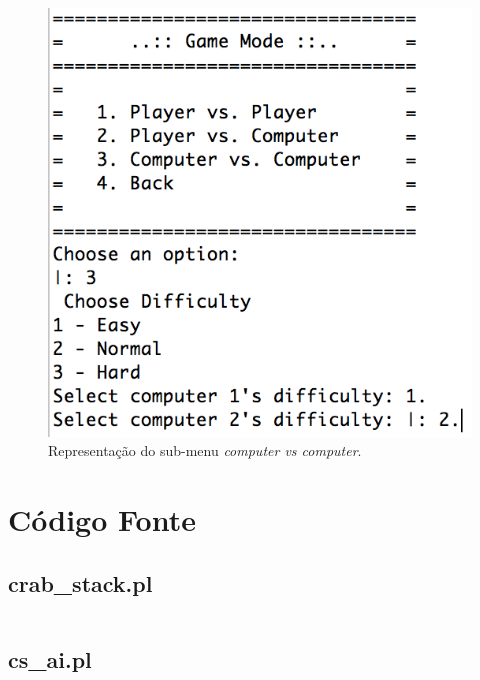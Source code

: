 \documentclass[a4paper]{article}
\begin{document}
\begin{figure}[!ht]
	\begin{center}
	\includegraphics[scale=0.5]{img/computer_vs_computer.png}
	\caption{Representação do sub-menu \textit{computer vs computer}.}
    \label{Fig:computer_vs_computer}
	\end{center}
\end{figure}

\newpage

\section{Código Fonte} \label{app:source_code}

\subsection{crab\_stack.pl}

\begin{mdframed}[linecolor=black, topline=false, bottomline=false,
  leftline=false, rightline=false]
    \inputminted[fontsize=\scriptsize, linenos, breaklines=true]{prolog}{src/crab_stack.pl}
\end{mdframed}

\newpage

\subsection{cs\_ai.pl}
\end{document}
